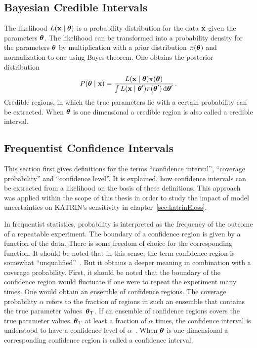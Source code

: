 \subsection{Bayesian Credible Intervals}
\label{sec:statMethodsUncertaintyIntervalsCredible}
The likelihood $L\giventhat{\dataVec}{\paramVec}$ is a probability distribution for the data $\boldsymbol{\mathbf{x}}$ given the parameters $\boldsymbol{\mathbf{\theta}}$. The likelihood can be transformed into a probability density for the parameters $\boldsymbol{\mathbf{\theta}}$ by multiplication with a prior distribution $\pi(\boldsymbol{\mathbf{\theta}})$ and normalization to one using Bayes theorem. One obtains the posterior distribution~\cite{ReviewOfParticlePhysics}
\begin{equation}
\label{eq:statMethodsPosterior}
	P\giventhat{\paramVec}{\dataVec} = 
		\frac{
			L\giventhat{\dataVec}{\paramVec}\pi(\paramVec)
		}{
			\int L\giventhat{\dataVec}{\paramVec^\prime}\pi(\paramVec^\prime) \d\paramVec^\prime
		}
	\fullstop
\end{equation}
Credible regions, in which the true parameters lie with a certain probability can be extracted. When $\boldsymbol{\mathbf{\theta}}$ is one dimensional a credible region is also called a credible interval. 

\subsection{Frequentist Confidence Intervals}
\label{sec:statMethodsUncertaintyIntervalsConfidence}
This section first gives definitions for the terms ``confidence interval'', ``coverage probability'' and ``confidence level''. It is explained, how confidence intervals can be extracted from a likelihood on the basis of these definitions. This approach was applied within the scope of this thesis in order to study the impact of model uncertainties on KATRIN's sensitivity in chapter~\ref{sec:katrinEloss}.

In frequentist statistics, probability is interpreted as the frequency of the outcome of a repeatable experiment. The boundary of a confidence region is given by a function of the data. There is some freedom of choice for the corresponding function. It should be noted that in this sense, the term confidence region is somewhat ``unqualified''~\cite{ReviewOfParticlePhysics}. But it obtains a deeper meaning in combination with a coverage probability. First, it should be noted that the boundary of the confidence region would fluctuate if one were to repeat the experiment many times. One would obtain an ensemble of confidence regions. The coverage probability $\alpha$ refers to the fraction of regions in such an ensemble that contains the true parameter values~$\boldsymbol{\mathbf{\theta}}_\mathrm{T}$\cite{ReviewOfParticlePhysics}. If an ensemble of confidence regions covers the true parameter values~$\boldsymbol{\mathbf{\theta}}_\mathrm{T}$ at least a fraction of $\alpha$ times, the confidence interval is understood to have a confidence level of $\alpha$~\cite{ReviewOfParticlePhysics}. When $\boldsymbol{\mathbf{\theta}}$ is one dimensional a corresponding confidence region is called a confidence interval. 


